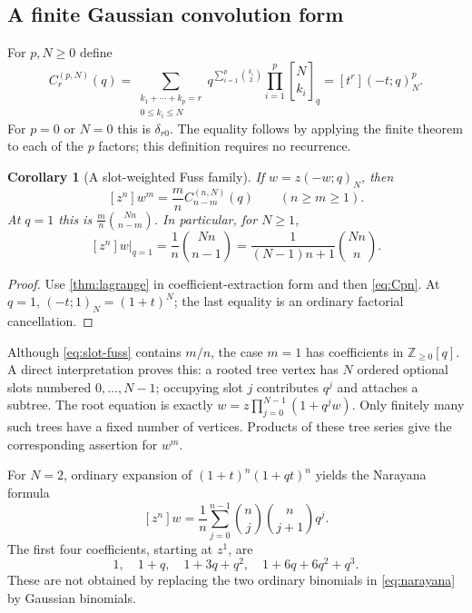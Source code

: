 \documentclass[11pt,a4paper]{article}
\numberwithin{equation}{section}
\newtheorem{corollary}[theorem]{Corollary}
\theoremstyle{definition}
\theoremstyle{remark}
\newcommand{\Z}{\mathbb Z}
\newcommand{\qb}[2]{\genfrac{[}{]}{0pt}{}{#1}{#2}_{q}}
\newcommand{\poch}[3]{(#1;#2)_{#3}}
\begin{document}
\subsection{A finite Gaussian convolution form}
For $p,N\ge0$ define
\begin{equation}\label{eq:Cpn}
 C_r^{(p,N)}(q)=
 \sum_{\substack{k_1+\cdots+k_p=r\\0\le k_i\le N}}
       q^{\sum_{i=1}^p\binom{k_i}2}\prod_{i=1}^p\qb N{k_i}
 =[t^r]\poch{-t}qN^p.
\end{equation}
For $p=0$ or $N=0$ this is $\delta_{r0}$. The equality follows by applying the
finite theorem to each of the $p$ factors; this definition requires no recurrence.

\begin{corollary}[A slot-weighted Fuss family]\label{cor:fuss}
If $w=z\poch{-w}qN$, then
\begin{equation}\label{eq:slot-fuss}
 [z^n]w^m=\frac mn C_{n-m}^{(n,N)}(q)\qquad(n\ge m\ge1).
\end{equation}
At $q=1$ this is $\frac mn\binom{Nn}{n-m}$. In particular, for $N\ge1$,
\begin{equation}\label{eq:fuss-limit}
 [z^n]w\big|_{q=1}
 =\frac1n\binom{Nn}{n-1}
 =\frac1{(N-1)n+1}\binom{Nn}n.
\end{equation}
\end{corollary}
\begin{proof}
Use \cref{thm:lagrange} in coefficient-extraction form and then
\eqref{eq:Cpn}. At $q=1$, $\poch{-t}1N=(1+t)^N$; the last equality is an
ordinary factorial cancellation.
\end{proof}
Although \eqref{eq:slot-fuss} contains $m/n$, the case $m=1$ has coefficients in
$\Z_{\ge0}[q]$. A direct interpretation proves this: a rooted tree vertex has
$N$ ordered optional slots numbered $0,\ldots,N-1$; occupying slot $j$ contributes
$q^j$ and attaches a subtree. The root equation is exactly
$w=z\prod_{j=0}^{N-1}(1+q^jw)$. Only finitely many such trees have a fixed number
of vertices. Products of these tree series give the corresponding assertion for
$w^m$.

For $N=2$, ordinary expansion of $(1+t)^n(1+qt)^n$ yields the Narayana formula
\begin{equation}\label{eq:narayana}
 [z^n]w=\frac1n\sum_{j=0}^{n-1}\binom nj\binom n{j+1}q^j.
\end{equation}
The first four coefficients, starting at $z^1$, are
\[
 1,\quad 1+q,\quad 1+3q+q^2,\quad 1+6q+6q^2+q^3.
\]
These are not obtained by replacing the two ordinary binomials in
\eqref{eq:narayana} by Gaussian binomials.
\end{document}
